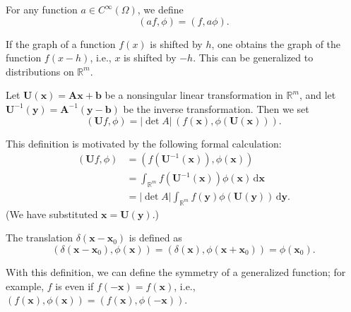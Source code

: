 \begin{Definition}
\label{def:distribution-smooth-product}
For any function $a\in C^\infty(\Omega)$, we define
\begin{equation}\label{eq:distribution-smooth-function-product}
(af,\phi)=(f,a\phi).
\end{equation}

\end{Definition}

If the graph of a function $f(x)$ is shifted by $h$, one obtains the graph of the function $f(x-h)$, i.e., $x$ is shifted by $-h$. This can be generalized to distributions on $\mathbb{R}^m$.

\begin{Definition}
\label{def:distribution-affine-change}
Let $\bm{U}(\bm{x})=\bm{A}\bm{x}+\bm{b}$ be a nonsingular linear transformation in $\mathbb{R}^m$, and let $\bm{U}^{-1}(\bm{y})=\bm{A}^{-1}(\bm{y}-\bm{b})$ be the inverse transformation. Then we set
\begin{equation}\label{eq:distribution-affine-change-variables}
(\bm{U}f,\phi)=|\det A|\,(f(\bm{x}),\phi(\bm{U}(\bm{x}))).
\end{equation}

\end{Definition}

This definition is motivated by the following formal calculation:\[
\begin{aligned}
(\bm{U}f,\phi)&=(f(\bm{U}^{-1}(\bm{x})),\phi(\bm{x}))\\
&=\int_{\mathbb{R}^m}f(\bm{U}^{-1}(\bm{x}))\phi(\bm{x})\,\mathrm{d}\bm{x}\\
&=|\det A|\int_{\mathbb{R}^m}f(\bm{y})\phi(\bm{U}(\bm{y}))\,\mathrm{d}\bm{y}.
\end{aligned}
\](We have substituted $\bm{x}=\bm{U}(\bm{y})$.)

\begin{Example}
\label{ex:translated-dirac-delta}
The translation $\delta(\bm{x}-\bm{x}_0)$ is defined as
\begin{equation}\label{eq:translated-dirac-delta-pairing}
(\delta(\bm{x}-\bm{x}_0),\phi(\bm{x}))=(\delta(\bm{x}),\phi(\bm{x}+\bm{x}_0))=\phi(\bm{x}_0).
\end{equation}

\end{Example}

\begin{Remark}
\label{rem:distribution-symmetry}
With this definition, we can define the symmetry of a generalized function; for example, $f$ is even if $f(-\bm{x})=f(\bm{x})$, i.e., $(f(\bm{x}),\phi(\bm{x}))=(f(\bm{x}),\phi(-\bm{x}))$.
\end{Remark}

